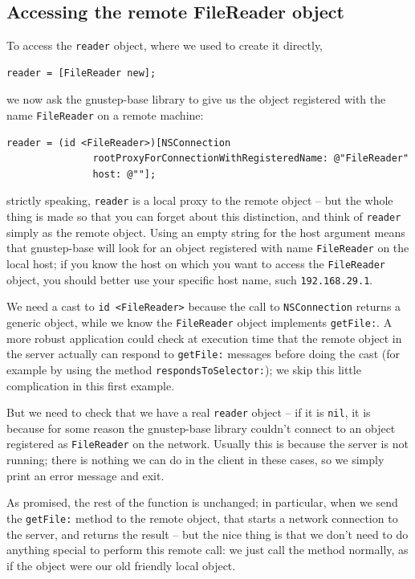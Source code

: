 \documentclass[a4paper]{article}
\begin{document}
\subsection{Accessing the remote FileReader object}
To access the \texttt{reader} object, where we used to create it
directly,
\begin{verbatim}
reader = [FileReader new];
\end{verbatim}
we now ask the gnustep-base library to give us the object registered
with the name \texttt{FileReader} on a remote machine:
\begin{verbatim}
reader = (id <FileReader>)[NSConnection
               rootProxyForConnectionWithRegisteredName: @"FileReader" 
               host: @""];
\end{verbatim}
strictly speaking, \texttt{reader} is a local proxy to the remote
object -- but the whole thing is made so that you can forget about
this distinction, and think of \texttt{reader} simply as the remote
object.  Using an empty string for the host argument means that
gnustep-base will look for an object registered with name
\texttt{FileReader} on the local host; if you know the host on which
you want to access the \texttt{FileReader} object, you should better
use your specific host name, such \texttt{192.168.29.1}.

We need a cast to \texttt{id <FileReader>} because the call to
\texttt{NSConnection} returns a generic object, while we know the
\texttt{FileReader} object implements \texttt{getFile:}.  A more
robust application could check at execution time that the remote
object in the server actually can respond to \texttt{getFile:}
messages before doing the cast (for example by using the method
\texttt{respondsToSelector:}); we skip this little complication in
this first example.

But we need to check that we have a real \texttt{reader} object -- if
it is \texttt{nil}, it is because for some reason the gnustep-base
library couldn't connect to an object registered as
\texttt{FileReader} on the network.  Usually this is because the
server is not running; there is nothing we can do in the client in
these cases, so we simply print an error message and exit.

As promised, the rest of the function is unchanged; in particular,
when we send the \texttt{getFile:} method to the remote object, that
starts a network connection to the server, and returns the result --
but the nice thing is that we don't need to do anything special to
perform this remote call: we just call the method normally, as if the
object were our old friendly local object.
\end{document}
